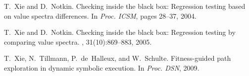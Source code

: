 \documentclass{sig-alternate}
\begin{document}
\begin{thebibliography}{10}
\begin{scriptsize}
T.~Xie and D.~Notkin.
\newblock Checking inside the black box: Regression testing based on value
  spectra differences.
\newblock In {\em Proc. ICSM}, pages 28--37, 2004.

T.~Xie and D.~Notkin.
\newblock Checking inside the black box: Regression testing by comparing value
  spectra.
, 31(10):869--883, 2005.

T.~Xie, N.~Tillmann, P.~de~Halleux, and W.~Schulte.
\newblock Fitness-guided path exploration in dynamic symbolic execution.
\newblock In {\em Proc. DSN}, 2009.

\end{scriptsize}
\end{thebibliography}
\end{document}
